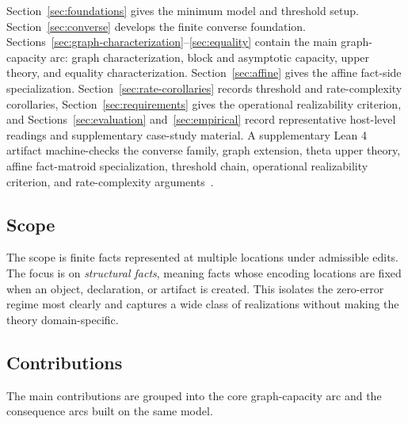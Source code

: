 Section~\ref{sec:foundations} gives the minimum model and threshold setup. Section~\ref{sec:converse} develops the finite converse foundation. Sections~\ref{sec:graph-characterization}--\ref{sec:equality} contain the main graph-capacity arc: graph characterization, block and asymptotic capacity, upper theory, and equality characterization. Section~\ref{sec:affine} gives the affine fact-side specialization. Section~\ref{sec:rate-corollaries} records threshold and rate-complexity corollaries, Section~\ref{sec:requirements} gives the operational realizability criterion, and Sections~\ref{sec:evaluation} and~\ref{sec:empirical} record representative host-level readings and supplementary case-study material. A supplementary Lean 4 artifact machine-checks the converse family, graph extension, theta upper theory, affine fact-matroid specialization, threshold chain, operational realizability criterion, and rate-complexity arguments~\cite{demoura2021lean4}.

\subsection{Scope}\label{sec:scope}

The scope is finite facts represented at multiple locations under admissible edits. The focus is on \emph{structural facts}, meaning facts whose encoding locations are fixed when an object, declaration, or artifact is created. This isolates the zero-error regime most clearly and captures a wide class of realizations without making the theory domain-specific.

\subsection{Contributions}\label{sec:contributions}

The main contributions are grouped into the core graph-capacity arc and the consequence arcs built on the same model.
